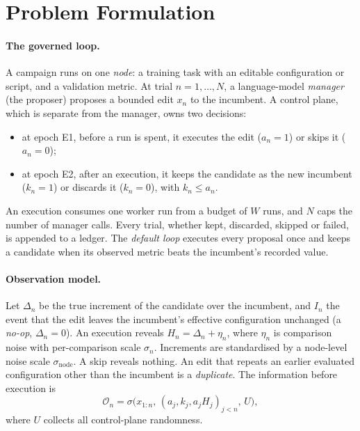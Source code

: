 \section{Problem Formulation}
\label{sec:problem}

\paragraph{The governed loop.}
A campaign runs on one \emph{node}: a training task with an editable configuration or script, and a validation metric. At trial $n=1,\dots,N$, a language-model \emph{manager} (the proposer) proposes a bounded edit $x_n$ to the incumbent. A control plane, which is separate from the manager, owns two decisions:
\begin{itemize}
\item at epoch E1, before a run is spent, it executes the edit ($a_n=1$) or skips it ($a_n=0$);
\item at epoch E2, after an execution, it keeps the candidate as the new incumbent ($k_n=1$) or discards it ($k_n=0$), with $k_n\le a_n$.
\end{itemize}
An execution consumes one worker run from a budget of $W$ runs, and $N$ caps the number of manager calls. Every trial, whether kept, discarded, skipped or failed, is appended to a ledger. The \emph{default loop} executes every proposal once and keeps a candidate when its observed metric beats the incumbent's recorded value.

\paragraph{Observation model.}
Let $\Delta_n$ be the true increment of the candidate over the incumbent, and $I_n$ the event that the edit leaves the incumbent's effective configuration unchanged (a \emph{no-op}, $\Delta_n=0$). An execution reveals $H_n=\Delta_n+\eta_n$, where $\eta_n$ is comparison noise with per-comparison scale $\sigma_n$. Increments are standardised by a node-level noise scale $\sigma_{\mathrm{node}}$. A skip reveals nothing. An edit that repeats an earlier evaluated configuration other than the incumbent is a \emph{duplicate}. The information before execution is
\[
\mathcal{O}_n=\sigma\bigl(x_{1:n},\,(a_j,k_j,a_jH_j)_{j<n},\,U\bigr),
\]
where $U$ collects all control-plane randomness.

